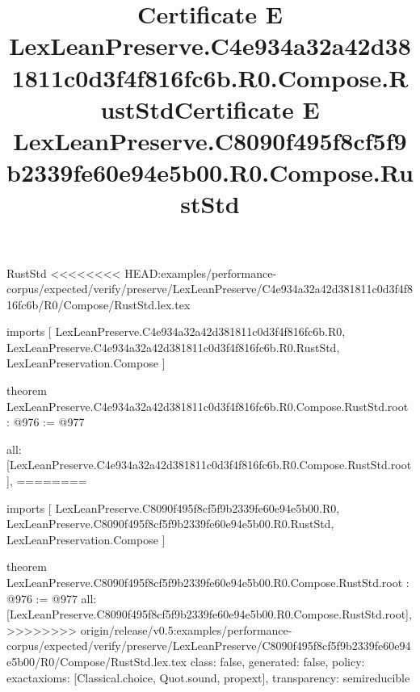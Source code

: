 \begin{lexlean}{RustStd}
<<<<<<<< HEAD:examples/performance-corpus/expected/verify/preserve/LexLeanPreserve/C4e934a32a42d381811c0d3f4f816fc6b/R0/Compose/RustStd.lex.tex
\title{Certificate E LexLeanPreserve.C4e934a32a42d381811c0d3f4f816fc6b.R0.Compose.RustStd}
\begin{coremodule}
imports [
  LexLeanPreserve.C4e934a32a42d381811c0d3f4f816fc6b.R0,
  LexLeanPreserve.C4e934a32a42d381811c0d3f4f816fc6b.R0.RustStd,
  LexLeanPreservation.Compose
]

theorem LexLeanPreserve.C4e934a32a42d381811c0d3f4f816fc6b.R0.Compose.RustStd.root : @976 := @977 {
  all: [LexLeanPreserve.C4e934a32a42d381811c0d3f4f816fc6b.R0.Compose.RustStd.root],
========
\title{Certificate E LexLeanPreserve.C8090f495f8cf5f9b2339fe60e94e5b00.R0.Compose.RustStd}
\begin{coremodule}
imports [
  LexLeanPreserve.C8090f495f8cf5f9b2339fe60e94e5b00.R0,
  LexLeanPreserve.C8090f495f8cf5f9b2339fe60e94e5b00.R0.RustStd,
  LexLeanPreservation.Compose
]

theorem LexLeanPreserve.C8090f495f8cf5f9b2339fe60e94e5b00.R0.Compose.RustStd.root : @976 := @977 {
  all: [LexLeanPreserve.C8090f495f8cf5f9b2339fe60e94e5b00.R0.Compose.RustStd.root],
>>>>>>>> origin/release/v0.5:examples/performance-corpus/expected/verify/preserve/LexLeanPreserve/C8090f495f8cf5f9b2339fe60e94e5b00/R0/Compose/RustStd.lex.tex
  class: false,
  generated: false,
  policy: exact{axioms: [Classical.choice, Quot.sound, propext]},
  transparency: semireducible
}


\end{coremodule}}
\end{coremodule}
\end{lexlean}
